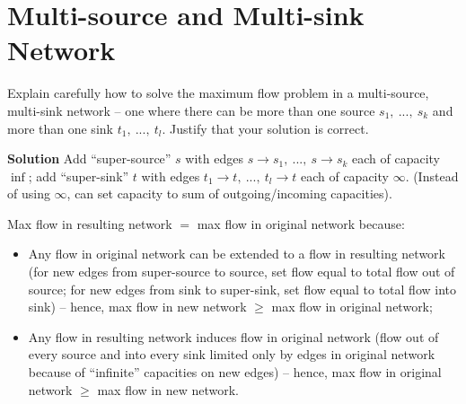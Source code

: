 \documentclass{article}
\begin{document}
\section{Multi-source and Multi-sink Network}
Explain carefully how to solve the maximum flow problem in a
multi-source, multi-sink network -- one where there can be more than one
source $s_1,~...,~s_k$ and more than one sink $t_1,~...,~t_l$. Justify that your
solution is correct.

{\bf Solution} 
Add ``super-source'' $s$ with edges $s \rightarrow s_1,~...,~s\rightarrow s_k$
each of capacity $\inf$; add ``super-sink'' $t$ with edges 
$t_1 \rightarrow t,~...,~ t_l \rightarrow t$ each of capacity $\infty$. 
(Instead of using $\infty$, can set capacity to sum of outgoing/incoming
capacities).

Max flow in resulting network $=$ max flow in original network because:
\begin{itemize}
\item Any flow in original network can be extended to a flow in resulting
network (for new edges from super-source to source, set flow equal to
total flow out of source; for new edges from sink to super-sink, set
flow equal to total flow into sink) -- hence, max flow in new network
$\ge$ max flow in original network;
\item Any flow in resulting network induces flow in original network (flow
out of every source and into every sink limited only by edges in
original network because of ``infinite'' capacities on new edges) -- 
hence, max flow in original network $\ge$ max flow in new network.
\end{itemize}
\end{document}

